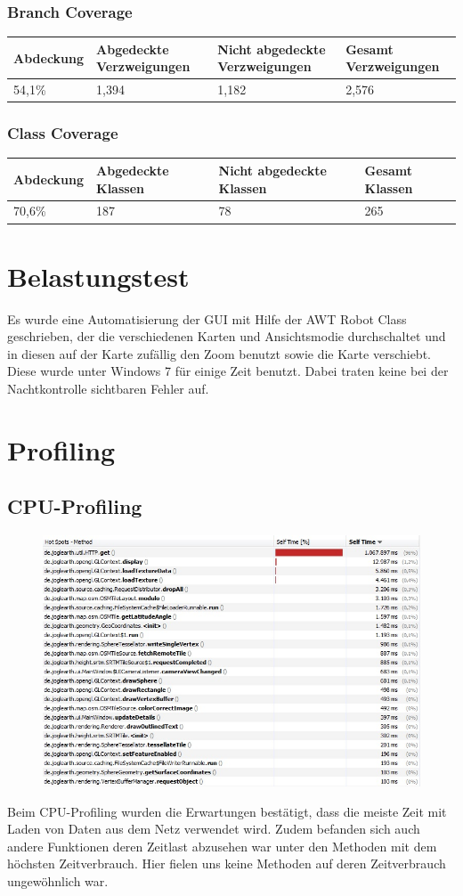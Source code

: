 \documentclass[10pt]{scrreprt}
\begin{document}
\subsection{Branch Coverage}
\begin{longtable}{|l|p{}|p{}|p{}|}
\hline
Abdeckung & Abgedeckte Verzweigungen & Nicht abgedeckte Verzweigungen & Gesamt Verzweigungen \\
\hline
\hline
54,1\% & 1,394 & 1,182 & 2,576 \\
\hline
\end{longtable}
\subsection{Class Coverage}
\begin{longtable}{|l|p{}|p{}|p{}|}
\hline
Abdeckung & Abgedeckte Klassen & Nicht abgedeckte Klassen & Gesamt Klassen \\
\hline
\hline
70,6\% & 187 & 78 & 265 \\
\hline
\end{longtable}
\chapter{Belastungstest}
Es wurde eine Automatisierung der GUI mit Hilfe der AWT Robot Class geschrieben, der die verschiedenen Karten und Ansichtsmodie durchschaltet und in diesen auf der Karte zufällig den Zoom benutzt sowie die Karte verschiebt. 	Diese wurde unter Windows 7 für einige Zeit benutzt. Dabei traten keine bei der Nachtkontrolle sichtbaren Fehler auf.
\chapter{Profiling}
\section{CPU-Profiling}
\begin{figure}[!htb]
\includegraphics[scale=0.8]{cpu_profiling_normal.jpg}
\end{figure}
\vspace{3mm}
Beim CPU-Profiling wurden die Erwartungen bestätigt, dass die meiste Zeit mit Laden von Daten aus dem Netz verwendet wird.
Zudem befanden sich auch andere Funktionen deren Zeitlast abzusehen war unter den Methoden mit dem höchsten Zeitverbrauch. Hier fielen uns keine Methoden auf deren Zeitverbrauch ungewöhnlich war.
\newpage
\end{document}
